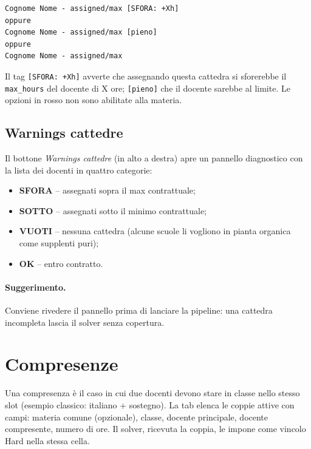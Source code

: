 \begin{lstlisting}
Cognome Nome - assigned/max [SFORA: +Xh]
oppure
Cognome Nome - assigned/max [pieno]
oppure
Cognome Nome - assigned/max
\end{lstlisting}

Il tag \texttt{[SFORA: +Xh]} avverte che assegnando questa
cattedra si sforerebbe il \texttt{max\_hours} del docente di X
ore; \texttt{[pieno]} che il docente sarebbe al limite. Le
opzioni in rosso non sono abilitate alla materia.

\subsection{Warnings cattedre}

Il bottone \emph{Warnings cattedre} (in alto a destra) apre un
pannello diagnostico con la lista dei docenti in quattro categorie:

\begin{itemize}
\item \textbf{SFORA} -- assegnati sopra il max contrattuale;
\item \textbf{SOTTO} -- assegnati sotto il minimo
  contrattuale;
\item \textbf{VUOTI} -- nessuna cattedra (alcune scuole li
  vogliono in pianta organica come supplenti puri);
\item \textbf{OK} -- entro contratto.
\end{itemize}

\paragraph{Suggerimento.} Conviene rivedere il pannello prima
di lanciare la pipeline: una cattedra incompleta lascia il
solver senza copertura.

\section{Compresenze}
\label{sec:tab_compresenze}

Una compresenza \`e il caso in cui due docenti devono stare in
classe nello stesso slot (esempio classico: italiano +
sostegno). La tab elenca le coppie attive con campi:
materia comune (opzionale), classe, docente principale, docente
compresente, numero di ore. Il solver, ricevuta la coppia, le
impone come vincolo Hard nella stessa cella.


